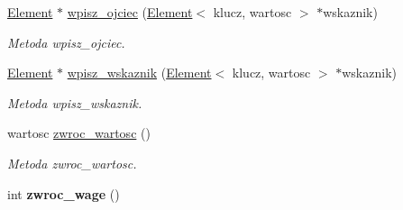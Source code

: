 \begin{DoxyCompactItemize}
\hyperlink{class_element}{Element} $\ast$ \hyperlink{class_element_a94b4bdc29d96c3e58fd4d70ae5a83c19}{wpisz\+\_\+ojciec} (\hyperlink{class_element}{Element}$<$ klucz, wartosc $>$ $\ast$wskaznik)
\begin{DoxyCompactList}\small\item\em Metoda wpisz\+\_\+ojciec. \end{DoxyCompactList}\item 
\hyperlink{class_element}{Element} $\ast$ \hyperlink{class_element_af2382789cc701857527bdaae54dd3fc0}{wpisz\+\_\+wskaznik} (\hyperlink{class_element}{Element}$<$ klucz, wartosc $>$ $\ast$wskaznik)
\begin{DoxyCompactList}\small\item\em Metoda wpisz\+\_\+wskaznik. \end{DoxyCompactList}\item 
wartosc \hyperlink{class_element_a5f1d13188101292091170d462cdf2fbd}{zwroc\+\_\+wartosc} ()
\begin{DoxyCompactList}\small\item\em Metoda zwroc\+\_\+wartosc. \end{DoxyCompactList}\item 
\hypertarget{class_element_a748fcfad2139d088fd7f612578663909}{int {\bfseries zwroc\+\_\+wage} ()}\label{class_element_a748fcfad2139d088fd7f612578663909}


\end{DoxyCompactItemize}
